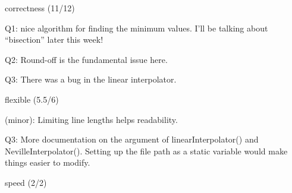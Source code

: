 correctness (11/12)

Q1: nice algorithm for finding the minimum values.  I'll be talking
about ``bisection'' later this week!

Q2: Round-off is the fundamental issue here.

Q3: There was a bug in the linear interpolator.

flexible  (5.5/6)

(minor): Limiting line lengths helps readability.

Q3:
More documentation on the argument of linearInterpolator() and
NevilleInterpolator().
Setting up the file path as a static variable would make things easier
to modify.

speed (2/2)

